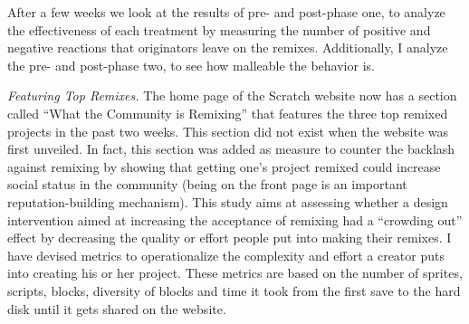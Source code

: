 After a few weeks we look at the results of pre- and post-phase one, to analyze the effectiveness of each treatment by measuring the number of positive and negative reactions that originators leave on the remixes. 
Additionally, I analyze the pre- and post-phase two, to see how malleable the behavior is.

\emph{Featuring Top Remixes.}
The home page of the Scratch website now has a section called ``What the Community is Remixing''  that features the three top remixed projects in the past two weeks.
This section did not exist when the website was first unveiled.
In fact, this section was added as measure to counter the backlash against remixing by showing that getting one's project remixed could increase social status in the community (being on the front page is an important reputation-building mechanism).
This study aims at assessing whether a design intervention aimed at increasing the acceptance of remixing had a ``crowding out'' effect by decreasing the quality or effort people put into making their remixes.
I have devised metrics to operationalize the complexity and effort a creator puts into creating his or her project. These metrics are based on the number of sprites, scripts, blocks, diversity of blocks and time it took from the first save to the hard disk until it gets shared on the website.

